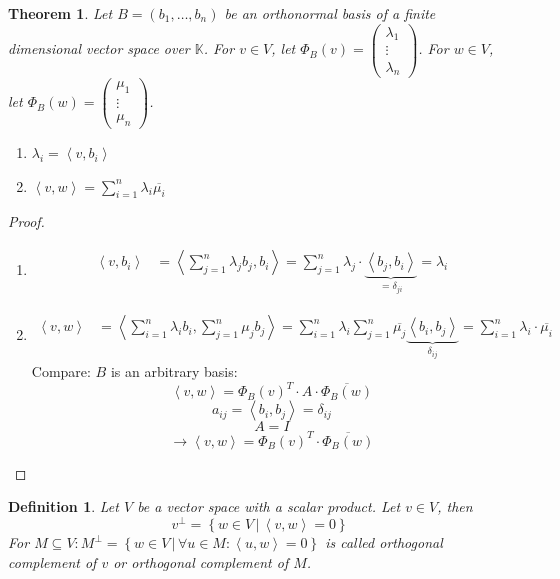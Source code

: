 \documentclass[a4paper]{article}
\newcounter{lecref}[section]
\numberwithin{lecref}{section}
\newtheorem{theorem}[lecref]{Theorem}
\newtheorem{definition}[lecref]{Definition}
\newcommand{\setdef}[2]{\left\{\left.#1\,\right|\,#2\right\}}
\newcommand{\ip}[2]{\left\langle#1,#2\right\rangle} %
\begin{document}
\begin{theorem} %
  Let $B = (b_1, \ldots, b_n)$ be an orthonormal basis of a finite dimensional vector space over $\mathbb K$.
  For $v \in V$, let $\Phi_B(v) = \begin{pmatrix} \lambda_1 \\ \vdots \\ \lambda_n \end{pmatrix}$.
  For $w \in V$, let $\Phi_B(w) = \begin{pmatrix} \mu_1 \\ \vdots \\ \mu_n \end{pmatrix}$.
  \begin{enumerate}
    \item $\lambda_i = \ip{v}{b_i}$
    \item $\ip vw = \sum_{i=1}^n \lambda_i \overline{\mu_i}$
  \end{enumerate}
\end{theorem}

\begin{proof}
  \begin{enumerate}
    \item
      \begin{align*}
        \ip{v}{b_i} &= \ip{\sum_{j=1}^n \lambda_j b_j}{b_i} 
                    = \sum_{j=1}^n \lambda_j \cdot \underbrace{\ip{b_j}{b_i}}_{= \delta_{ji}}
                    = \lambda_i
      \end{align*}
    \item
      \begin{align*}
        \ip vw &= \ip{\sum_{i=1}^n \lambda_i b_i}{\sum_{j=1}^n \mu_j b_j}
               = \sum_{i=1}^n \lambda_i \sum_{j=1}^n \overline{\mu_j} \underbrace{\ip{b_i}{b_j}}_{\delta_{ij}}
               = \sum_{i=1}^n \lambda_i \cdot \overline{\mu_i}
      \end{align*}
      Compare: $B$ is an arbitrary basis:
      \[ \ip vw = \Phi_B(v)^T \cdot A \cdot \overline{\Phi_B(w)} \]
      \[ a_{ij} = \ip{b_i}{b_j} = \delta_{ij} \]
      \[ A = I \]
      \[ \to \ip vw = \Phi_B(v)^T \cdot \overline{\Phi_B(w)} \]
  \end{enumerate}
\end{proof}

\begin{definition}
  Let $V$ be a vector space with a scalar product.
  Let $v \in V$, then
  \[ v^\bot = \setdef{w \in V}{\ip vw = 0} \]
  For $M \subseteq V: M^\bot = \setdef{w \in V}{\forall u \in M: \ip uw = 0}$
  is called \emph{orthogonal complement of $v$} or \emph{orthogonal complement of $M$}.
\end{definition}
\end{document}
